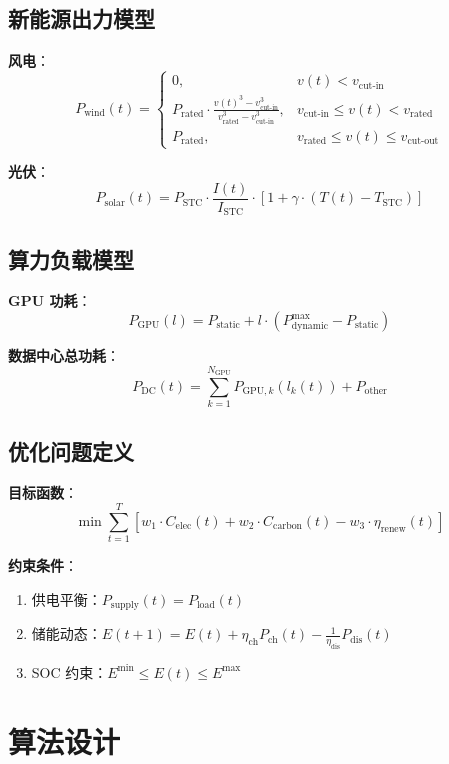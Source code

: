 \documentclass[12pt,a4paper]{article}
\begin{document}
\subsection{新能源出力模型}

\textbf{风电}：
$$P_{\text{wind}}(t) = \begin{cases}
0, & v(t) < v_{\text{cut-in}} \\
P_{\text{rated}} \cdot \frac{v(t)^3 - v_{\text{cut-in}}^3}{v_{\text{rated}}^3 - v_{\text{cut-in}}^3}, & v_{\text{cut-in}} \leq v(t) < v_{\text{rated}} \\
P_{\text{rated}}, & v_{\text{rated}} \leq v(t) \leq v_{\text{cut-out}}
\end{cases}$$

\textbf{光伏}：
$$P_{\text{solar}}(t) = P_{\text{STC}} \cdot \frac{I(t)}{I_{\text{STC}}} \cdot [1 + \gamma \cdot (T(t) - T_{\text{STC}})]$$

\subsection{算力负载模型}

\textbf{GPU 功耗}：
$$P_{\text{GPU}}(l) = P_{\text{static}} + l \cdot (P_{\text{dynamic}}^{\max} - P_{\text{static}})$$

\textbf{数据中心总功耗}：
$$P_{\text{DC}}(t) = \sum_{k=1}^{N_{\text{GPU}}} P_{\text{GPU},k}(l_k(t)) + P_{\text{other}}$$

\subsection{优化问题定义}

\textbf{目标函数}：
$$\min \sum_{t=1}^{T} \left[ w_1 \cdot C_{\text{elec}}(t) + w_2 \cdot C_{\text{carbon}}(t) - w_3 \cdot \eta_{\text{renew}}(t) \right]$$

\textbf{约束条件}：
\begin{enumerate}
    \item 供电平衡：$P_{\text{supply}}(t) = P_{\text{load}}(t)$
    \item 储能动态：$E(t+1) = E(t) + \eta_{\text{ch}}P_{\text{ch}}(t) - \frac{1}{\eta_{\text{dis}}}P_{\text{dis}}(t)$
    \item SOC 约束：$E^{\min} \leq E(t) \leq E^{\max}$
\end{enumerate}

\section{算法设计}
\label{sec:algo}
\end{document}
